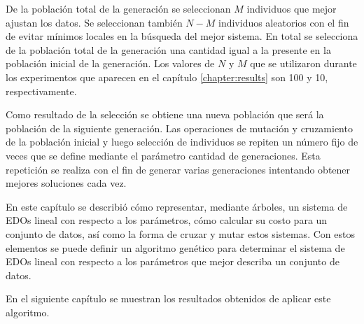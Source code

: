 De la población total de la generación se seleccionan $M$ individuos que mejor ajustan los datos. Se seleccionan también $N - M$ individuos aleatorios con el fin de evitar mínimos locales en la búsqueda del mejor sistema. En total se selecciona de la población total de la generación una cantidad igual a la presente en la población inicial de la generación. Los valores de $N$ y $M$ que se utilizaron durante los experimentos que aparecen en el capítulo \ref{chapter:results} son 100 y 10, respectivamente.

Como resultado de la selección se obtiene una nueva población que será la población de la siguiente generación. Las operaciones de mutación y cruzamiento de la población inicial y luego selección de individuos se repiten un número fijo de veces que se define mediante el parámetro cantidad de generaciones. Esta repetición se realiza con el fin de generar varias generaciones intentando obtener mejores soluciones cada vez.

En este capítulo se describió cómo representar, mediante árboles, un sistema de EDOs lineal con respecto a los parámetros, cómo calcular su costo para un conjunto de datos, así como la forma de cruzar y mutar estos sistemas. Con estos elementos se puede definir un algoritmo genético para determinar el sistema de EDOs lineal con respecto a los parámetros que mejor describa un conjunto de datos.

En el siguiente capítulo se muestran los resultados obtenidos de aplicar este algoritmo.